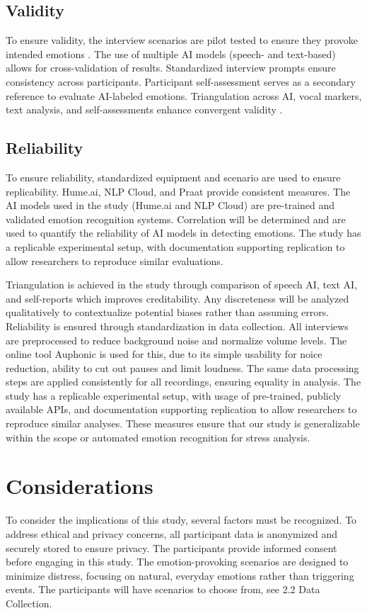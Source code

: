 \subsection{Validity}
To ensure validity, the interview scenarios are pilot tested to ensure they provoke intended emotions \autocite{Bryman2022}. The use of multiple AI models (speech- and text-based) allows for cross-validation of results. Standardized interview prompts ensure consistency across participants. Participant self-assessment serves as a secondary reference to evaluate AI-labeled emotions. Triangulation across AI, vocal markers, text analysis, and self-assessments enhance convergent validity \autocite{Creswell2023}. 

\subsection{Reliability}
To ensure reliability, standardized equipment and scenario are used to ensure replicability. Hume.ai, NLP Cloud, and Praat provide consistent measures. The AI models used in the study (Hume.ai and NLP Cloud) are pre-trained and validated emotion recognition systems. Correlation will be determined and are used to quantify the reliability of AI models in detecting emotions. The study has a replicable experimental setup, with documentation supporting replication to allow researchers to reproduce similar evaluations.  

Triangulation is achieved in the study through comparison of speech AI, text AI, and self-reports which improves creditability. Any discreteness will be analyzed qualitatively to contextualize potential biases rather than assuming errors. 
Reliability is ensured through standardization in data collection. All interviews are preprocessed to reduce background noise and normalize volume levels. The online tool Auphonic \autocite{Auphonic} is used for this, due to its simple usability for noice reduction, ability to cut out pauses and limit loudness. The same data processing steps are applied consistently for all recordings, ensuring equality in analysis. The study has a replicable experimental setup, with usage of pre-trained, publicly available APIs, and documentation supporting replication to allow researchers to reproduce similar analyses. These measures ensure that our study is generalizable within the scope or automated emotion recognition for stress analysis. 

\section{Considerations}
To consider the implications of this study, several factors must be recognized. To address ethical and privacy concerns, all participant data is anonymized and securely stored to ensure privacy. The participants provide informed consent before engaging in this study. The emotion-provoking scenarios are designed to minimize distress, focusing on natural, everyday emotions rather than triggering events. The participants will have scenarios to choose from, see 2.2 Data Collection. 

